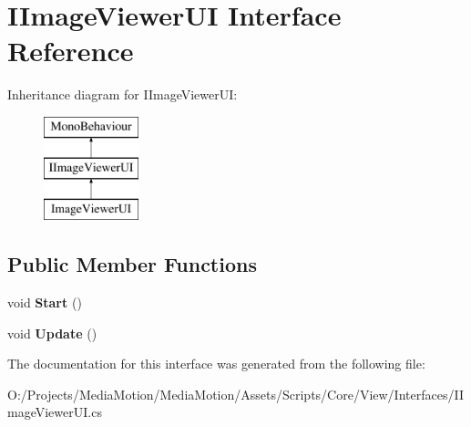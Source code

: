 \hypertarget{interface_i_image_viewer_u_i}{\section{I\+Image\+Viewer\+U\+I Interface Reference}
\label{interface_i_image_viewer_u_i}
}
Inheritance diagram for I\+Image\+Viewer\+U\+I\+:\begin{figure}[H]
\begin{center}
\leavevmode
\includegraphics[height=3.000000cm]{interface_i_image_viewer_u_i}
\end{center}
\end{figure}
\subsection*{Public Member Functions}
\begin{DoxyCompactItemize}
\item 
\hypertarget{interface_i_image_viewer_u_i_a5bd01238a79a6a0efb536075817851bb}{void {\bfseries Start} ()}\label{interface_i_image_viewer_u_i_a5bd01238a79a6a0efb536075817851bb}

\item 
\hypertarget{interface_i_image_viewer_u_i_ac21a61f93c1a2b7c04aec352dd6cd715}{void {\bfseries Update} ()}\label{interface_i_image_viewer_u_i_ac21a61f93c1a2b7c04aec352dd6cd715}

\end{DoxyCompactItemize}


The documentation for this interface was generated from the following file\+:\begin{DoxyCompactItemize}
\item 
O\+:/\+Projects/\+Media\+Motion/\+Media\+Motion/\+Assets/\+Scripts/\+Core/\+View/\+Interfaces/I\+Image\+Viewer\+U\+I.\+cs\end{DoxyCompactItemize}
